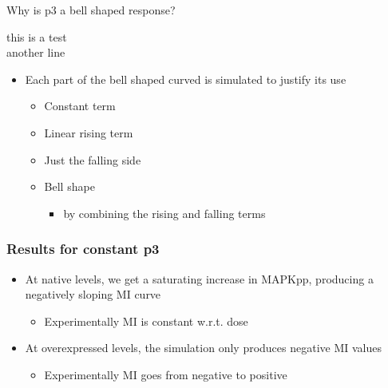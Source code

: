 

\begin{frame}{Why is p3 a bell shaped response?}
  \begin{reference}{4mm}{85mm}
    this is a test \\
    another line
  \end{reference}
  \begin{itemize}
    \itemsep3em
    \item Each part of the bell shaped curved is simulated to justify its use
    \begin{itemize}
      \item Constant term
      \item Linear rising term
      \item Just the falling side
      \item Bell shape
      \begin{itemize}
        \item by combining the rising and falling terms 
      \end{itemize}
    \end{itemize}
  \end{itemize}
\end{frame}


\begin{frame}
  \frametitle{Results for constant p3}
  \begin{itemize}
    \itemsep3em
    \item At native levels, we get a saturating increase in MAPKpp, producing
      a negatively sloping MI curve
      \begin{itemize}
          \item Experimentally MI is constant w.r.t. dose
      \end{itemize}
    \item At overexpressed levels, the simulation only produces negative MI
      values
      \begin{itemize}
          \item Experimentally MI goes from negative to positive
      \end{itemize}
  \end{itemize}
\end{frame}

